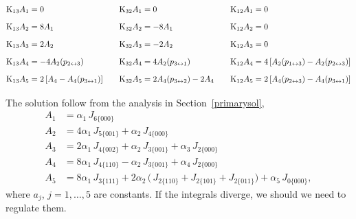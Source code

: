 \documentclass[a4paper,11pt,openright,twoside]{book}
\let\a=\alpha   \let\b=\beta   \let\g=\gamma   \let\d=\delta
\newcommand{\secref}[1]{Section~\ref{#1}}		%
\numberwithin{equation}{section}
\begin{document}
{{{\begin{equation}
	\begin{aligned}[c]
		&\textup{K}_{13}A_1=0 \\[1.5ex]
		&\textup{K}_{13}A_2=8 A_1 \\[1.5ex]
		& \textup{K}_{13}A_3=2A_2 \\[1.5ex]
		& \textup{K}_{13}A_4=-4A_2(p_{2\leftrightarrow 3}) \\[1.5ex]
		& \textup{K}_{13}A_5=2\left[A_4-A_4(p_{3\leftrightarrow 1}) \right]\\[1.5ex]
	\end{aligned}
	\qquad
	\begin{aligned}[c]
		&\textup{K}_{32}  A_1=0 \\[1.5ex]
		&\textup{K}_{32}A_2=-8 A_1 \\[1.5ex]
		&\textup{K}_{32}A_3=-2A_2 \\[1.5ex]
		&\textup{K}_{32}A_4= 4A_2(p_{3\leftrightarrow 1})\\[1.5ex]
		&\textup{K}_{32}A_5=2A_4(p_{3\leftrightarrow 2})-2A_4 \\[1.5ex]
	\end{aligned}\qquad
	\begin{aligned}[c]
		&\textup{K}_{12}A_1=0 \\[1.5ex]
		&\textup{K}_{12}A_2=0\\[1.5ex]
		& \textup{K}_{12}A_3=0\\[1.5ex]
		& \textup{K}_{12}A_4=4\left[A_2(p_{1\leftrightarrow 3})-A_2(p_{2\leftrightarrow 3}) \right]\\[1.5ex]
		& \textup{K}_{12}A_5=2\left[A_4(p_{2\leftrightarrow 3})-A_4(p_{3\leftrightarrow 1}) \right]\\[1.5ex]
	\end{aligned}
\end{equation}
The solution follow from the analysis in \secref{primarysol},
\begin{subequations}
	\begin{align}
		A_1&=\a_1\,J_{6\{000\}}\\
		A_2&=4\a_1\,J_{5\{001\}}+\a_2\,J_{4\{000\}}\\
		A_3&=2\a_1\,J_{4\{002\}}+\a_2\,J_{3\{001\}}+\a_3\,J_{2\{000\}}\\
		A_4&=8\a_1\,J_{4\{110\}}-\a_2\,J_{3\{001\}}+\a_4\,J_{2\{000\}}\\
		A_5&=8\a_1\,J_{3\{111\}}+2\a_2\,\big(\,J_{2\{110\}}+J_{2\{101\}}+J_{2\{011\}}\big)+\a_5\,J_{0\{000\}},
	\end{align}\label{PrimSolTTT}
\end{subequations}
where $a_j$, $j=1,\dots,5$ are constants. If the integrals diverge, we should we need to regulate them. 
}}}
\end{document}
